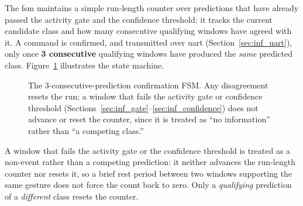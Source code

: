 The \acrshort{fsm} maintains a simple run-length counter over
predictions that have already passed the activity gate and the
confidence threshold: it tracks the current candidate class and how
many consecutive qualifying windows have agreed with it. A command
is confirmed, and transmitted over \acrshort{uart}
(Section~\ref{sec:inf_uart}), only once \textbf{3 consecutive}
qualifying windows have produced the \emph{same} predicted class.
Figure~\ref{fig:fsm} illustrates the state machine.

\begin{figure}[htbp]
\centering
{}
\caption{The 3-consecutive-prediction confirmation FSM. Any
disagreement resets the run; a window that fails the activity gate
or confidence threshold (Sections~\ref{sec:inf_gate}--\ref{sec:inf_confidence})
does not advance or reset the counter, since it is treated as ``no
information'' rather than ``a competing class.''}
\label{fig:fsm}
\end{figure}

A window that fails the activity gate or the confidence threshold
is treated as a non-event rather than a competing prediction: it
neither advances the run-length counter nor resets it, so a brief
rest period between two windows supporting the same gesture does
not force the count back to zero. Only a \emph{qualifying}
prediction of a \emph{different} class resets the counter.

